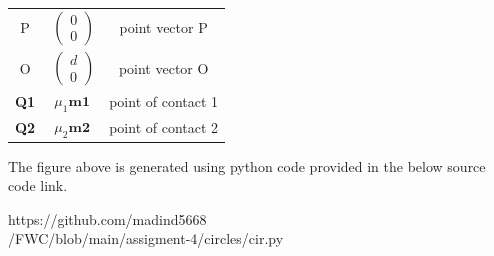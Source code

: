 \documentclass[a4paper,10pt]{report}
\let\vec\mathbf
\begin{document}
\begin{multicols}{2}
\begin{center}
\begin{tabular}{|c|c|c|}
        \large P & $\ \begin{pmatrix} 0\\0 \end{pmatrix}$ & \large point vector P\\
	\large O & $\ \begin{pmatrix} d\\0 \end{pmatrix}$ & \large point vector O\\
	\large \textbf{Q1} & $\mu_1\vec{m1}$ & point of contact 1\\
	\large \textbf{Q2} & $\mu_2\vec{m2}$ & point of contact 2\\
      \hline
   \end{tabular}
 \end{center}\vspace{5mm}
\raggedright\large{The figure above is generated using python code provided in the below source code link.}\vspace{2mm}\\
\begin{mdframed}
\raggedright\large{https://github.com/madind5668 \\ /FWC/blob/main/assigment-4/circles/cir.py}
\end{mdframed}
\end{multicols}
\end{document}
